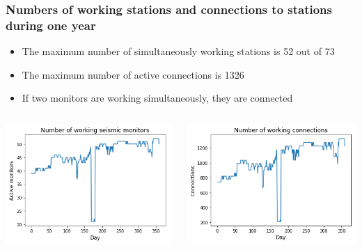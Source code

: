 \documentclass{beamer}
\begin{document}
\begin{frame}
\frametitle{Numbers of working stations and connections to stations during one year}
\begin{itemize}
\item The maximum number of simultaneously working stations is 52 out of 73
\item The maximum number of active connections is 1326
\item If two monitors are working simultaneously, they are connected
\end{itemize}

\begin{columns}
\includegraphics[width=\textwidth]{../figures/working_monitors-presentation.png}

\includegraphics[width=\textwidth]{../figures/working_connections_presentation.png}
\end{columns}
\end{frame}
\end{document}
